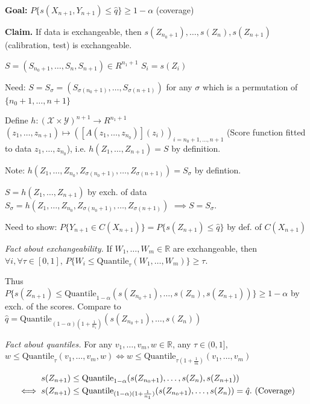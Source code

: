 \textbf{Goal:} $P\{s(X_{n+1}, Y_{n+1}) \le \hat{q}\} \ge 1 - \alpha$ (coverage)

\textbf{Claim.} If data is exchangeable, then $s(Z_{n_{0}+1}), \dots, s(Z_{n}), s(Z_{n+1})$ (calibration, test) is exchangeable.

\begin{pr}
$S = (S_{n_{0}+1}, \dots, S_{n}, S_{n+1}) \in R^{n_{1}+1}$
$S_{i} = s(Z_{i})$

Need: $S = S_{\sigma} = (S_{\sigma(n_{0}+1)}, \dots, S_{\sigma(n+1)})$ for any $\sigma$ which is a permutation of $\{n_{0}+1, \dots, n+1\}$

Define $h : (\mathcal{X} \times \mathcal{Y})^{n+1} \rightarrow R^{n_{1}+1}$
$(z_{1}, \dots, z_{n+1}) \mapsto ([A(z_{1}, \dots, z_{n_{0}})](z_{i}))_{i=n_{0}+1, \dots, n+1}$
(Score function fitted to data $z_{1}, \dots, z_{n_{0}}$), i.e. $h(Z_{1}, \dots, Z_{n+1}) = S$ by definition.

Note: $h(Z_{1}, \dots, Z_{n_{0}}, Z_{\sigma(n_{0}+1)}, \dots, Z_{\sigma(n+1)}) = S_{\sigma}$ by defintion.

$S = h(Z_{1}, \dots, Z_{n+1})$ by exch. of data
$S_{\sigma} = h(Z_{1}, \dots, Z_{n_{0}}, Z_{\sigma(n_{0}+1)}, \dots, Z_{\sigma(n+1)})$
$\implies S = S_{\sigma}$.
\end{pr}

Need to show: $P\{Y_{n+1} \in C(X_{n+1})\} = P\{s(Z_{n+1}) \le \hat{q}\}$ by def. of $C(X_{n+1})$

\emph{Fact about exchangeability.}
If $W_{1}, \dots, W_{m} \in \mathbb{R}$ are exchangeable, then $\forall i, \forall \tau \in [0,1]$,
$P\{W_{i} \le \text{Quantile}_{\tau}(W_{1}, \dots, W_{m})\} \ge \tau$.

Thus $P\{s(Z_{n+1}) \le \text{Quantile}_{1-\alpha}(s(Z_{n_{0}+1}), \dots, s(Z_{n}), s(Z_{n+1}))\} \ge 1 - \alpha$ by exch. of the scores.
Compare to $\hat{q} = \text{Quantile}_{(1-\alpha)(1+\frac{1}{n_{1}})}(s(Z_{n_{0}+1}), \dots, s(Z_{n}))$

\emph{Fact about quantiles.} For any $v_{1}, \dots, v_{m}, w \in \mathbb{R}$, any $\tau \in (0, 1]$,
$w \le \text{Quantile}_{\tau}(v_{1}, \dots, v_{m}, w) \iff w \le \text{Quantile}_{\tau(1+\frac{1}{m})}(v_{1}, \dots, v_{m})$

\begin{align*}
s(Z_{n+1}) &\le \text{Quantile}_{1-\alpha}(s(Z_{n_{0}+1}), \dots, s(Z_{n}), s(Z_{n+1})) \\
\iff
s(Z_{n+1}) &\le \text{Quantile}_{(1-\alpha)(1+\frac{1}{n_{1}})}(s(Z_{n_{0}+1}), \dots, s(Z_{n})) = \hat{q}. \textup{ (Coverage)}
\end{align*}


